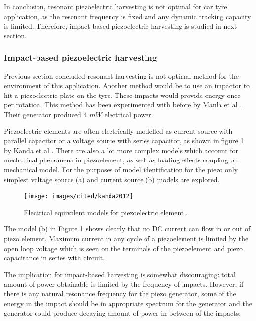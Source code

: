 In conclusion, resonant piezoelectric harvesting is not optimal for car tyre application, as the resonant frequency is fixed and any dynamic tracking capacity is limited. Therefore, impact-based piezoelectric harvesting is studied in next section.

\subsubsection{Impact-based piezoelectric harvesting}
Previous section concluded resonant harvesting is not optimal method for the environment of this application. Another method would be to use an impactor to hit a piezoelectric plate on the tyre. These impacts would provide energy once per rotation. This method has been experimented with before by Manla et al \cite{Manla2009}. Their generator produced 4 $mW$ electrical power.

Piezoelectric elements are often electrically modelled as current source with parallel capacitor or a voltage source with series capacitor, as shown in figure \ref{fig:piezo_equivalents} by Kanda et al \cite{Kanda2012}. There are also a lot more complex models which account for mechanical phenomena in piezoelement, as well as loading effects coupling on mechanical model. For the purposes of model identification for the piezo only simplest voltage source (a) and current source (b) models are explored.

\begin{figure}[htb]
  \begin{center}
  \texttt{[image: images/cited/kanda2012]}
  \end{center}
  \caption{Electrical equivalent models for piezoelectric element \cite{Kanda2012}.}
  \label{fig:piezo_equivalents}
\end{figure}

The model (b) in Figure \ref{fig:piezo_equivalents} shows clearly that no DC current can flow in or out of piezo element. Maximum current in any cycle of a piezoelement is limited by the open loop voltage which is seen on the terminals of the piezoelement and piezo capacitance in series with circuit. 

The implication for impact-based harvesting is somewhat discouraging: total amount of power obtainable is limited by the frequency of impacts. However, if there is any natural resonance frequency for the piezo generator, some of the energy in the impact should be in appropriate spectrum for the generator and the generator could produce decaying amount of power in-between of the impacts.

